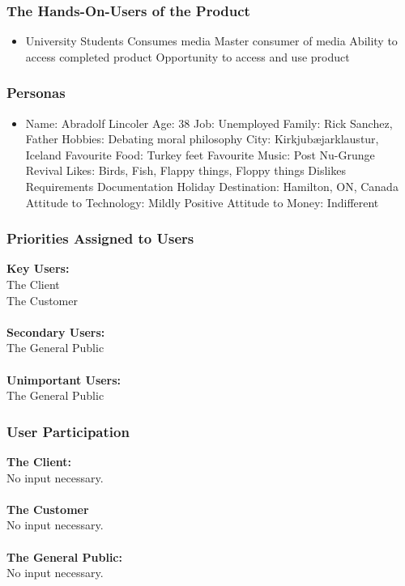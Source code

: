 \documentclass[11pt, oneside]{article}   	%
\begin{document}
\subsubsection{The Hands-On-Users of the Product}
\begin{itemize}
\item University Students
\subitem Consumes media
\subitem Master consumer of media
\subitem Ability to access completed product
\subitem Opportunity to access and use product
\end{itemize}


\subsubsection{Personas}
\begin{itemize}
\item Name: Abradolf Lincoler
\subitem Age: 38
\subitem Job: Unemployed
\subitem Family: Rick Sanchez, Father
\subitem Hobbies: Debating moral philosophy
\subitem City: Kirkjub\ae jarklaustur, Iceland
\subitem Favourite Food: Turkey feet
\subitem Favourite Music: Post Nu-Grunge Revival
\subitem Likes: Birds, Fish, Flappy things, Floppy things
\subitem Dislikes Requirements Documentation
\subitem Holiday Destination:  Hamilton, ON, Canada
\subitem Attitude to Technology: Mildly Positive
\subitem Attitude to Money: Indifferent
\end{itemize}


\subsubsection{Priorities Assigned to Users}

\textbf{Key Users:}\\
The Client\\
The Customer\\
\\
\textbf{Secondary Users:}\\
The General Public\\
\\
\textbf{Unimportant Users:}\\
The General Public\\


\subsubsection{User Participation}
\textbf{The Client:}\\
No input necessary.\\
\\
\textbf{The Customer}\\
No input necessary.\\
\\
\textbf{The General Public:}\\
No input necessary.\\
\end{document}
